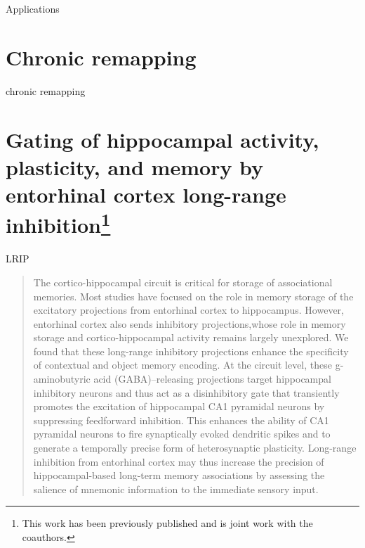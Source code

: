 \acresetall
Applications

\section{Chronic remapping}\label{sec:applications:chronic}
chronic remapping

\section[Gating of hippocampal activity, plasticity, and memory by entorhinal cortex long-range inhibition]{Gating of hippocampal activity, plasticity, and memory by entorhinal cortex long-range inhibition\footnote{This work has been previously published \citep{Basu2016} and is joint work with the coauthors.}}
LRIP
\begin{quote}
The cortico-hippocampal circuit is critical for storage of associational memories. Most studies have focused on the role in memory storage of the excitatory projections from entorhinal cortex to hippocampus. However, entorhinal cortex also sends inhibitory projections,whose role in memory storage and cortico-hippocampal activity remains largely unexplored. We found that these long-range inhibitory projections enhance the specificity of contextual and object memory encoding. At the circuit level, these g-aminobutyric acid (GABA)–releasing projections target hippocampal inhibitory neurons and thus act as a disinhibitory gate that transiently promotes the excitation of hippocampal CA1 pyramidal neurons by suppressing feedforward inhibition. This enhances the ability of CA1 pyramidal neurons to fire synaptically evoked dendritic spikes and to generate a temporally precise form of heterosynaptic plasticity. Long-range inhibition from entorhinal cortex may thus increase the precision of hippocampal-based long-term memory associations by assessing the salience of mnemonic information to the immediate sensory input.
\end{quote}

